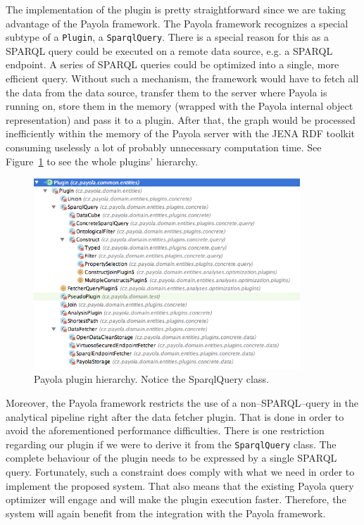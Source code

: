 The implementation of the plugin is pretty straightforward since we are 
taking advantage of the Payola framework. The Payola framework recognizes a
special subtype of a \texttt{Plugin}, a \texttt{SparqlQuery}. There is a special 
reason for this as a SPARQL query could be executed on a remote data source, 
e.g. a SPARQL endpoint. A series of SPARQL queries could be optimized into a 
single, more efficient query. Without such a mechanism, the framework would
have to fetch all the data from the data source, transfer them to the server 
where Payola is running on, store them in the memory (wrapped with
the Payola internal object representation) and pass it to a plugin. After that, the 
graph would be processed inefficiently within the memory of the Payola server with 
the JENA RDF toolkit consuming uselessly a lot of probably unnecessary computation time. See 
Figure~\ref{fig:plugin-hierarchy} to see the whole plugins’ hierarchy.


\begin{figure}
	\centering
	\includegraphics[width=100mm]{img/plugin-hierarchy.png}
	\caption{Payola plugin hierarchy. Notice the SparqlQuery class.}
	\label{fig:plugin-hierarchy}
\end{figure}

Moreover, the Payola framework restricts the use of a non--SPARQL--query 
in the analytical pipeline right after the data fetcher plugin. That is done in order to avoid 
the aforementioned performance difficulties. There is one restriction regarding our plugin if we
were to derive it from the \texttt{SparqlQuery} class. The complete behaviour of the plugin needs to 
be expressed by a single SPARQL query. Fortunately, such a constraint does 
comply with what we need in order to implement the proposed system. That also means
that the existing Payola query optimizer will engage and 
will make the plugin execution faster. Therefore, the system will again 
benefit from the integration with the Payola framework.

